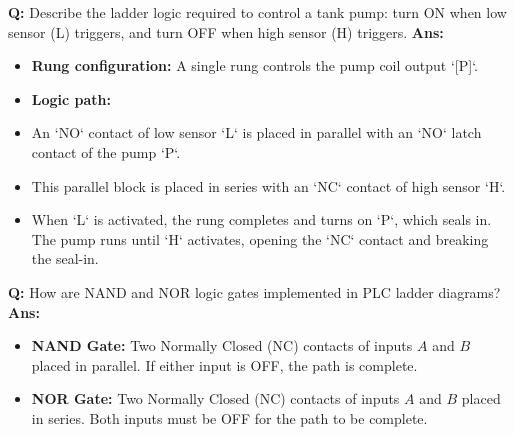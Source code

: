 \documentclass[10pt,a4paper,twocolumn]{article}
\begin{document}
\begin{tcolorbox}[
  colback=white,
  colframe=UnitColorThree,
  colbacktitle=gray!10!white,
  coltitle=black,
  fonttitle=\bfseries\sffamily\small,
  title={Unit III $\bullet$ Card 11: PLC Ladder Logic - Level Control},
  boxrule=1.2pt,
  arc=2mm,
  outer arc=2mm,
  boxsep=1.5mm,
  top=1mm,
  bottom=1mm,
  left=1.5mm,
  right=1.5mm,
  before skip=2.5mm,
  after skip=2.5mm
]
\textbf{Q:} Describe the ladder logic required to control a tank pump: turn ON when low sensor (L) triggers, and turn OFF when high sensor (H) triggers.
\tcbline
\textbf{Ans:} \begin{itemize}
  \item   \textbf{Rung configuration:} A single rung controls the pump coil output `[P]`.
  \item   \textbf{Logic path:}
  \item   An `NO` contact of low sensor `L` is placed in parallel with an `NO` latch contact of the pump `P`.
  \item   This parallel block is placed in series with an `NC` contact of high sensor `H`.
  \item   When `L` is activated, the rung completes and turns on `P`, which seals in. The pump runs until `H` activates, opening the `NC` contact and breaking the seal-in.
\end{itemize}
\end{tcolorbox}


\begin{tcolorbox}[
  colback=white,
  colframe=UnitColorThree,
  colbacktitle=gray!10!white,
  coltitle=black,
  fonttitle=\bfseries\sffamily\small,
  title={Unit III $\bullet$ Card 12: PLC Ladder Logic - NAND \& NOR Gates},
  boxrule=1.2pt,
  arc=2mm,
  outer arc=2mm,
  boxsep=1.5mm,
  top=1mm,
  bottom=1mm,
  left=1.5mm,
  right=1.5mm,
  before skip=2.5mm,
  after skip=2.5mm
]
\textbf{Q:} How are NAND and NOR logic gates implemented in PLC ladder diagrams?
\tcbline
\textbf{Ans:} \begin{itemize}
  \item   \textbf{NAND Gate:} Two Normally Closed (NC) contacts of inputs $A$ and $B$ placed in parallel. If either input is OFF, the path is complete.
  \item   \textbf{NOR Gate:} Two Normally Closed (NC) contacts of inputs $A$ and $B$ placed in series. Both inputs must be OFF for the path to be complete.
\end{itemize}
\end{tcolorbox}
\end{document}
